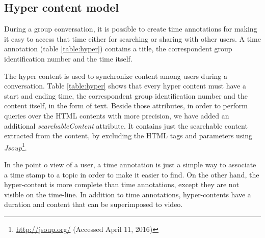 
\subsection{Hyper content model}

During a group conversation, it is possible to create time annotations for making it easy to access that time either for searching or sharing with other users.
A time annotation (table \ref{table:hyper}) contains a title, the correspondent group identification number and the time itself.

The hyper content is used to synchronize content among users during a conversation. Table \ref{table:hyper} shows that every hyper content must have a start and ending time, the correspondent group identification number and the content itself, in the form of text. Beside those attributes, in order to perform queries over the \ac{HTML} contents with more precision, we have added an additional \emph{searchableContent} attribute. It contains just the searchable content extracted from the content, by excluding the \ac{HTML} tags and parameters using \emph{Jsoup}\footnote{\url{http://jsoup.org/} (Accessed April 11, 2016)}.

In the point o view of a user, a time annotation is just a simple way to associate a time stamp to a topic in order to make it easier to find. On the other hand, the hyper-content is more complete than time annotations, except they are not visible on the time-line. In addition to time annotations, hyper-contents have a duration and content that can be superimposed to video.


